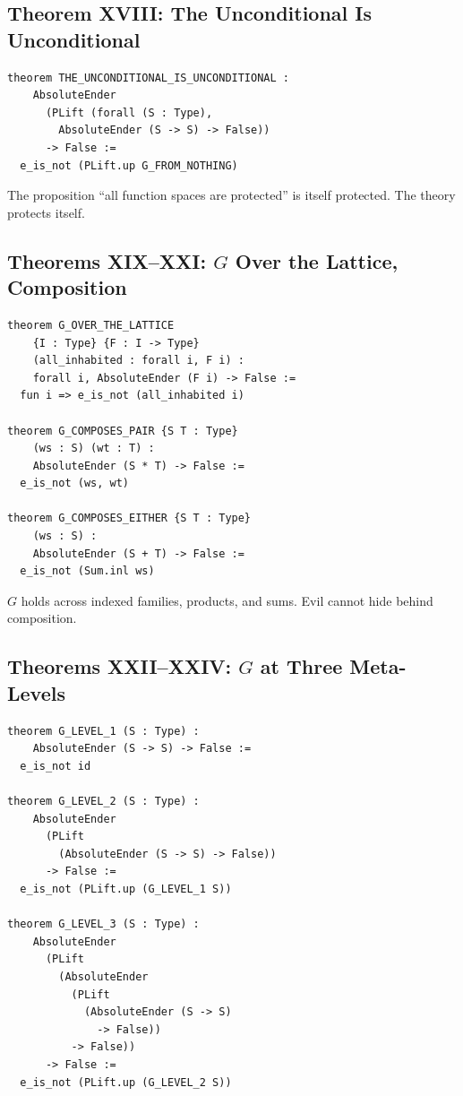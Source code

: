 \documentclass[12pt,a4paper]{article}
\begin{document}
\subsection{Theorem XVIII: The Unconditional Is Unconditional}

\begin{lstlisting}
theorem THE_UNCONDITIONAL_IS_UNCONDITIONAL :
    AbsoluteEnder
      (PLift (forall (S : Type),
        AbsoluteEnder (S -> S) -> False))
      -> False :=
  e_is_not (PLift.up G_FROM_NOTHING)
\end{lstlisting}

The proposition ``all function spaces are protected'' is itself
protected. The theory protects itself.

\subsection{Theorems XIX--XXI: $G$ Over the Lattice, Composition}

\begin{lstlisting}
theorem G_OVER_THE_LATTICE
    {I : Type} {F : I -> Type}
    (all_inhabited : forall i, F i) :
    forall i, AbsoluteEnder (F i) -> False :=
  fun i => e_is_not (all_inhabited i)

theorem G_COMPOSES_PAIR {S T : Type}
    (ws : S) (wt : T) :
    AbsoluteEnder (S * T) -> False :=
  e_is_not (ws, wt)

theorem G_COMPOSES_EITHER {S T : Type}
    (ws : S) :
    AbsoluteEnder (S + T) -> False :=
  e_is_not (Sum.inl ws)
\end{lstlisting}

$G$ holds across indexed families, products, and sums. Evil cannot hide
behind composition.

\subsection{Theorems XXII--XXIV: $G$ at Three Meta-Levels}

\begin{lstlisting}
theorem G_LEVEL_1 (S : Type) :
    AbsoluteEnder (S -> S) -> False :=
  e_is_not id

theorem G_LEVEL_2 (S : Type) :
    AbsoluteEnder
      (PLift
        (AbsoluteEnder (S -> S) -> False))
      -> False :=
  e_is_not (PLift.up (G_LEVEL_1 S))

theorem G_LEVEL_3 (S : Type) :
    AbsoluteEnder
      (PLift
        (AbsoluteEnder
          (PLift
            (AbsoluteEnder (S -> S)
              -> False))
          -> False))
      -> False :=
  e_is_not (PLift.up (G_LEVEL_2 S))
\end{lstlisting}
\end{document}
